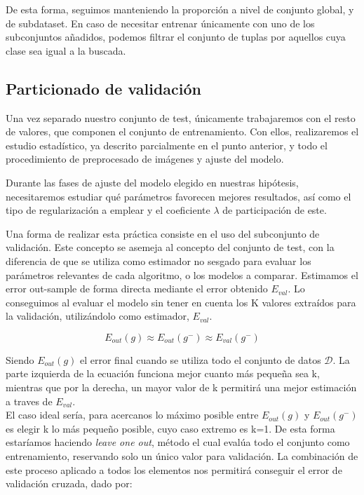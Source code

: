 De esta forma, seguimos manteniendo la proporción a nivel de conjunto global, y de subdataset. En caso de necesitar entrenar únicamente con uno de los subconjuntos añadidos, podemos filtrar el conjunto de tuplas por aquellos cuya clase sea igual a la buscada.

\subsection{Particionado de validación}

Una vez separado nuestro conjunto de test, únicamente trabajaremos con el resto de valores, que componen el conjunto de entrenamiento. Con ellos, realizaremos el estudio estadístico, ya descrito parcialmente en el punto anterior, y todo el procedimiento de preprocesado de imágenes y ajuste del modelo.

Durante las fases de ajuste del modelo elegido en nuestras hipótesis, necesitaremos estudiar qué parámetros favorecen mejores resultados, así como el tipo de regularización a emplear y el coeficiente $\lambda$ de participación de este.

Una forma de realizar esta práctica consiste en el uso del subconjunto de validación. Este concepto se asemeja al concepto del conjunto de test, con la diferencia de que se utiliza como estimador no sesgado para evaluar los parámetros relevantes de cada algoritmo, o los modelos a comparar. Estimamos el error out-sample de forma directa mediante el error obtenido $E_{val}$. Lo conseguimos al evaluar el modelo sin tener en cuenta los K valores extraídos para la validación, utilizándolo como estimador, $E_{val}$.

$$E_{out}(g) \approx E_{out}(g^-) \approx E_{val}(g^-)$$

Siendo $E_{out}(g)$ el error final cuando se utiliza todo el conjunto de datos $\mathcal D$.
La parte izquierda de la ecuación funciona mejor cuanto más pequeña sea k, mientras que por la derecha, un mayor valor de k permitirá una mejor estimación a traves de $E_{val}$.\\

El caso ideal sería, para acercanos lo máximo posible entre $E_{out}(g)$ y $ E_{out}(g^-)$ es elegir k lo más pequeño posible, cuyo caso extremo es k=1. De esta forma estaríamos haciendo \textit{leave one out}, método el cual evalúa todo el conjunto como entrenamiento, reservando solo un único valor para validación. La combinación de este proceso aplicado a todos los elementos nos permitirá conseguir el error de validación cruzada, dado por:

